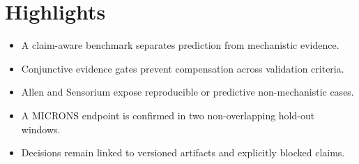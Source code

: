 \documentclass[a4paper]{article}
\begin{document}
\section*{Highlights}
\begin{itemize}
\item A claim-aware benchmark separates prediction from mechanistic evidence.
\item Conjunctive evidence gates prevent compensation across validation criteria.
\item Allen and Sensorium expose reproducible or predictive non-mechanistic cases.
\item A MICRONS endpoint is confirmed in two non-overlapping hold-out windows.
\item Decisions remain linked to versioned artifacts and explicitly blocked claims.
\end{itemize}
\end{document}
